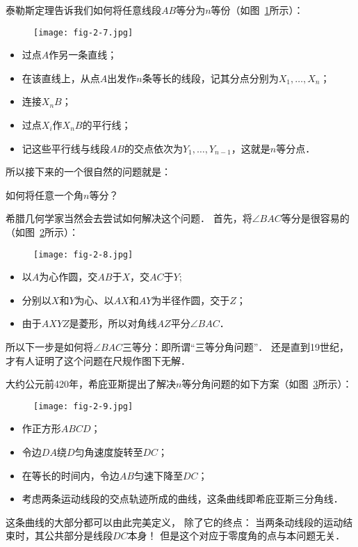\documentclass[cn,fancy,blue,11pt]{elegantbook}
\begin{document}
泰勒斯定理告诉我们如何将任意线段$AB$等分为$n$等份（如图~\ref{fig:2-7}所示）：
\begin{figure}[htbp]
	\centering
	\texttt{[image: fig-2-7.jpg]}
	\caption{\label{fig:2-7}}
\end{figure}
\begin{itemize}
	\item 过点$A$作另一条直线；
	\item 在该直线上，从点$A$出发作$n$条等长的线段，记其分点分别为$X_1,\dots,X_n$；
	\item 连接$X_nB$；
	\item 过点$X_i$作$X_nB$的平行线；
	\item 记这些平行线与线段$AB$的交点依次为$Y_1,\dots,Y_{n-1}$，这就是$n$等分点．
\end{itemize}
所以接下来的一个很自然的问题就是：
\begin{framed}
	如何将任意一个角$n$等分？
\end{framed}
希腊几何学家当然会去尝试如何解决这个问题．
首先，将$\angle BAC$等分是很容易的（如图~\ref{fig:2-8}所示）：
\begin{figure}[htbp]
	\centering
	\texttt{[image: fig-2-8.jpg]}
	\caption{\label{fig:2-8}}
\end{figure}
\begin{itemize}
	\item 以$A$为心作圆，交$AB$于$X$，交$AC$于$Y$;
	\item 分别以$X$和$Y$为心、以$AX$和$AY$为半径作圆，交于$Z$；
	\item 由于$AXYZ$是菱形，所以对角线$AZ$平分$\angle BAC$．
\end{itemize}
所以下一步是如何将$\angle BAC$三等分：即所谓``三等分角问题''．
还是直到19世纪，才有人证明了这个问题在尺规作图下无解．

大约公元前420年，希庇亚斯提出了解决$n$等分角问题的如下方案（如图~\ref{fig:2-9}所示）：
\begin{figure}[htbp]
	\centering
	\texttt{[image: fig-2-9.jpg]}
	\caption{\label{fig:2-9}}
\end{figure}
\begin{itemize}
	\item 作正方形$ABCD$；
	\item 令边$DA$绕$D$匀角速度旋转至$DC$；
	\item 在等长的时间内，令边$AB$匀速下降至$DC$；
	\item 考虑两条运动线段的交点轨迹所成的曲线，这条曲线即希庇亚斯三分角线．
\end{itemize}
这条曲线的大部分都可以由此完美定义，
除了它的终点：
当两条动线段的运动结束时，其公共部分是线段$DC$本身！
但是这个对应于零度角的点与本问题无关．
\end{document}
